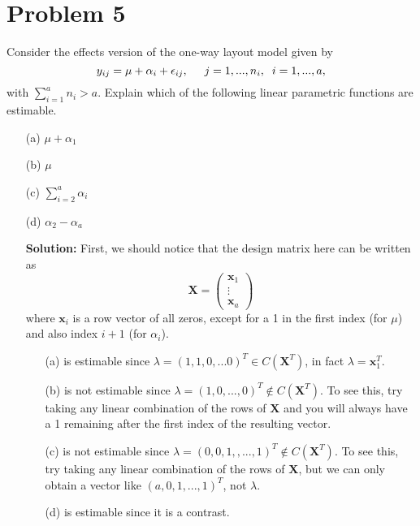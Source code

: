 \documentclass[11pt]{article}
\begin{document}
\section*{Problem 5}
Consider the effects version of the one-way layout model given by
\[
y_{ij} = \mu + \alpha_i + \epsilon_{ij}, \hspace{5mm} j=1,...,n_i, \hspace{2mm} i=1,...,a,
\]
with $\sum_{i=1}^a n_i > a$.  Explain which of the following linear parametric functions are estimable.
\begin{itemize}
\item[(a)] $\mu + \alpha_1$
\item[(b)] $\mu$
\item[(c)] $\sum_{i=2}^a \alpha_i$
\item[(d)] $\alpha_2 - \alpha_a$
\end{itemize}
\begin{itemize}
\item[] \textbf{Solution:}  First, we should notice that the design matrix here can be written as
\[
\mathbf{X} = \begin{pmatrix}
\mathbf{x}_1 \\ \vdots \\ \mathbf{x}_a
\end{pmatrix}
\]
where $\mathbf{x}_i$ is a row vector of all zeros, except for a 1 in the first index (for $\mu$) and also index $i+1$ (for $\alpha_i$).
\begin{itemize}
\item[(a)]is estimable since $\lambda = (1,1,0,...0)^T\in C(\mathbf{X}^T)$, in fact $\lambda = \mathbf{x}_1^T$.
\item[(b)] is not estimable since $\lambda = (1,0,...,0)^T\not\in C(\mathbf{X}^T)$.  To see this, try taking any linear combination of the rows of $\mathbf{X}$ and you will always have a 1 remaining after the first index of the resulting vector.
\item[(c)] is not estimable since $\lambda = (0,0,1,,...,1)^T\not\in C(\mathbf{X}^T)$.  To see this, try taking any linear combination of the rows of $\mathbf{X}$, but we can only obtain a vector like $(a,0,1,...,1)^T$, not $\lambda$.
\item[(d)] is estimable since it is a contrast.
\end{itemize}
\end{itemize}
\end{document}
